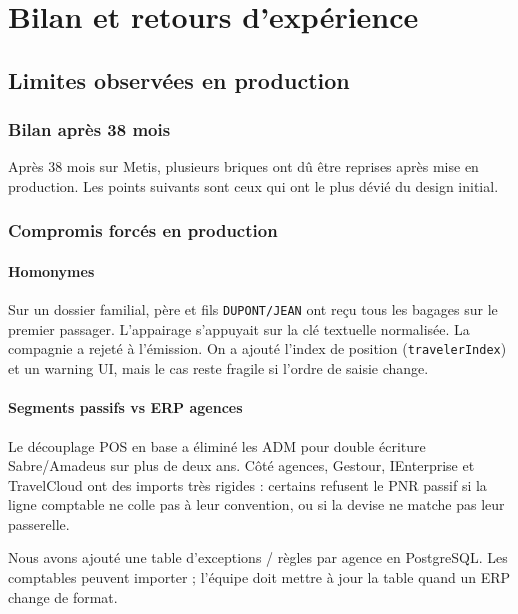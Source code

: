 \part{Bilan et retours d'expérience}
\label{part:demarche_reflexive}

\chapter{Limites observées en production}
\label{chap:reponse_problematique}

\section{Bilan après 38 mois}

\noindent Après 38 mois sur Metis, plusieurs briques ont dû être reprises après mise en production. Les points suivants sont ceux qui ont le plus dévié du design initial.

\section{Compromis forcés en production}

\subsection{Homonymes}

Sur un dossier familial, père et fils \texttt{DUPONT/JEAN} ont reçu tous les bagages sur le premier passager. L'appairage s'appuyait sur la clé textuelle normalisée. La compagnie a rejeté à l'émission. On a ajouté l'index de position (\texttt{travelerIndex}) et un warning UI, mais le cas reste fragile si l'ordre de saisie change.

\subsection{Segments passifs vs ERP agences}

Le découplage POS en base a éliminé les ADM pour double écriture Sabre/Amadeus sur plus de deux ans. Côté agences, Gestour, IEnterprise et TravelCloud ont des imports très rigides : certains refusent le PNR passif si la ligne comptable ne colle pas à leur convention, ou si la devise ne matche pas leur passerelle.

Nous avons ajouté une table d'exceptions / règles par agence en PostgreSQL. Les comptables peuvent importer ; l'équipe doit mettre à jour la table quand un ERP change de format.

